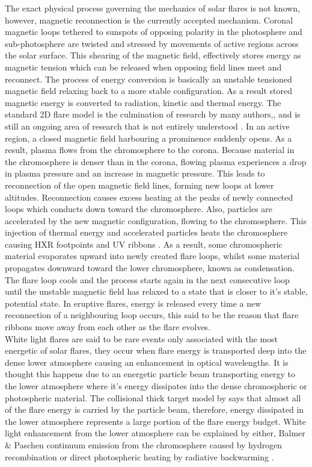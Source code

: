 The exact physical process governing the mechanics of solar flares is not known, however, magnetic reconnection is the currently accepted mechanism. Coronal magnetic loops tethered to sunspots of opposing polarity in the photosphere and sub-photosphere are twisted and stressed by movements of active regions across the solar surface. This shearing of the magnetic field, effectively stores energy as magnetic tension which can be released when opposing field lines meet and reconnect. The process of energy conversion is basically an unstable tensioned magnetic field relaxing back to a more stable configuration. As a result stored magnetic energy is converted to radiation, kinetic and thermal energy. The standard 2D flare model is the culmination of research by many authors,\citep{1964NASSP..50..451C, 1966Natur.211..695S, 1974SoPh...34..323H, 1976SoPh...50...85K}, and is still an ongoing area of research that is not entirely understood \citep{2011LRSP....8....6S}. In an active region, a closed magnetic field harbouring a prominence suddenly opens. As a result, plasma flows from the chromosphere to the corona. Because material in the chromosphere is denser than in the corona, flowing plasma experiences a drop in plasma pressure and an increase in magnetic pressure. This leads to reconnection of the open magnetic field lines, forming new loops at lower altitudes. Reconnection causes excess heating at the peaks of newly connected loops which conducts down toward the chromosphere. Also, particles are accelerated by the new magnetic configuration, flowing to the chromosphere. This injection of thermal energy and accelerated particles heats the chromosphere causing HXR footpoints \citep{1995ApJ...455..347A} and UV ribbons \citep{2009A&A...493..241F}. As a result, some chromospheric material evaporates upward into newly created flare loops, whilst some material propagates downward toward the lower chromosphere, known as condensation. The flare loop cools and the process starts again in the next consecutive loop until the unstable magnetic field has relaxed to a state that is closer to it's stable,  potential state. In eruptive flares, energy is released every time a new reconnection of a neighbouring loop occurs, this said to be the reason that flare ribbons move away from each other as the flare evolves. \\
White light flares are said to be rare events only associated with the most energetic of solar flares, they occur when flare energy is transported deep into the dense lower atmosphere causing an enhancement in optical wavelengths. It is thought this happens due to an energetic particle beam transporting energy to the lower atmosphere where it's energy dissipates into the dense chromospheric or photospheric material. The collisional thick target model by \cite{1971SoPh...18..489B} says that almost all of the flare energy is carried by the particle beam, therefore, energy dissipated in the lower atmosphere represents a large portion of the flare energy budget. White light enhancement from the lower atmosphere can be explained by either, Balmer \& Paschen continuum emission from the chromosphere caused by hydrogen recombination or direct photospheric heating \citep{2007ASPC..368..417D} by radiative backwarming \citep{1989SoPh..124..303M}. 



